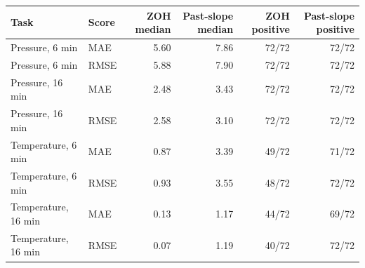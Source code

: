 \begin{tabular}{@{}llrrrr@{}}
\toprule
Task & Score & ZOH median & Past-slope median & ZOH positive & Past-slope positive \\
\midrule
Pressure, 6 min & MAE & 5.60 & 7.86 & 72/72 & 72/72 \\
Pressure, 6 min & RMSE & 5.88 & 7.90 & 72/72 & 72/72 \\
Pressure, 16 min & MAE & 2.48 & 3.43 & 72/72 & 72/72 \\
Pressure, 16 min & RMSE & 2.58 & 3.10 & 72/72 & 72/72 \\
Temperature, 6 min & MAE & 0.87 & 3.39 & 49/72 & 71/72 \\
Temperature, 6 min & RMSE & 0.93 & 3.55 & 48/72 & 72/72 \\
Temperature, 16 min & MAE & 0.13 & 1.17 & 44/72 & 69/72 \\
Temperature, 16 min & RMSE & 0.07 & 1.19 & 40/72 & 72/72 \\
\bottomrule
\end{tabular}
